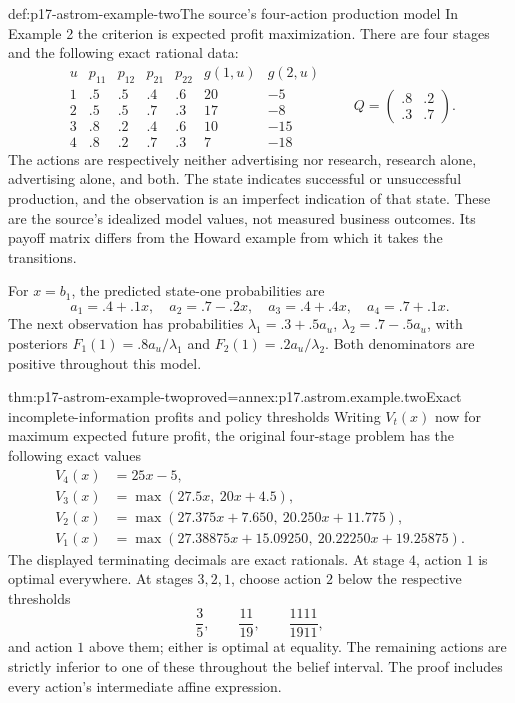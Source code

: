 \begin{hbdefinition}{def:p17-astrom-example-two}{The source's four-action production model}
In Example 2 the criterion is expected profit maximization.
There are four stages and the following exact rational data:
\[
 \begin{array}{c|cc|cc|rr}
 u&p_{11}&p_{12}&p_{21}&p_{22}&g(1,u)&g(2,u)\\ \hline
 1&.5&.5&.4&.6&20&-5\\
 2&.5&.5&.7&.3&17&-8\\
 3&.8&.2&.4&.6&10&-15\\
 4&.8&.2&.7&.3&7&-18
 \end{array}
 \qquad
 Q=\begin{pmatrix}.8&.2\\.3&.7\end{pmatrix}.
\]
The actions are respectively neither advertising nor research,
research alone, advertising alone, and both.
The state indicates successful or unsuccessful production,
and the observation is an imperfect indication of that state.
These are the source's idealized model values, not measured
business outcomes. Its payoff matrix differs from the Howard
example from which it takes the transitions.

For \(x=b_1\), the predicted state-one probabilities are
\[
       a_1=.4+.1x,\quad a_2=.7-.2x,\quad
       a_3=.4+.4x,\quad a_4=.7+.1x.
\]
The next observation has probabilities
\(\lambda_1=.3+.5a_u\), \(\lambda_2=.7-.5a_u\),
with posteriors \(F_1(1)=.8a_u/\lambda_1\) and
\(F_2(1)=.2a_u/\lambda_2\).
Both denominators are positive throughout this model.
\end{hbdefinition}

\begin{hbtheorem}{thm:p17-astrom-example-two}{proved=annex:p17.astrom.example.two}{Exact incomplete-information profits and policy thresholds}
Writing \(V_t(x)\) now for maximum expected future profit,
the original four-stage problem has the following exact values
\[
 \begin{split}
 V_4(x)&=25x-5,\\
 V_3(x)&=\max(27.5x,\ 20x+4.5),\\
 V_2(x)&=\max(27.375x+7.650,\ 20.250x+11.775),\\
 V_1(x)&=\max(27.38875x+15.09250,\
                              20.22250x+19.25875).
 \end{split}
\]
The displayed terminating decimals are exact rationals.
At stage \(4\), action \(1\) is optimal everywhere.
At stages \(3,2,1\), choose action \(2\) below the respective
thresholds
\[
                 \frac35,\qquad\frac{11}{19},
                                      \qquad\frac{1111}{1911},
\]
and action \(1\) above them; either is optimal at equality.
The remaining actions are strictly inferior to one of these
throughout the belief interval. The proof includes every
action's intermediate affine expression.
\end{hbtheorem}

